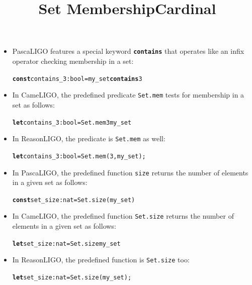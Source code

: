 \documentclass[wide]{slides}
\newcommand{\Kconst}[0]{\textbf{const}\xspace}
\newcommand{\Kcontains}[0]{\textbf{contains}\xspace}
\newcommand{\Klet}[0]{\textbf{let}\xspace}
\begin{document}
\begin{slide}
  \title{Set Membership}

  \begin{itemize}

    \item PascaLIGO features a special keyword
      \textbf{\texttt{contains}} that operates like an infix operator
      checking membership in a set:
      \begin{alltt}
\Kconst contains_3 : bool = my_set \Kcontains 3
      \end{alltt}

    \item In CameLIGO, the predefined predicate \texttt{Set.mem} tests
      for membership in a set as follows:
      \begin{alltt}
\Klet contains_3 : bool = Set.mem 3 my_set
      \end{alltt}

    \item In ReasonLIGO, the predicate is \texttt{Set.mem} as well:
      \begin{alltt}
\Klet contains_3 : bool = Set.mem (3, my_set);
      \end{alltt}

  \end{itemize}

\end{slide}

\begin{slide}
  \title{Cardinal}

  \begin{itemize}

    \item In PascaLIGO, the predefined function \texttt{size} returns
      the number of elements in a given set as follows:
      \begin{alltt}
\Kconst set_size : nat = Set.size (my_set)
      \end{alltt}

    \item In CameLIGO, the predefined function \texttt{Set.size}
      returns the number of elements in a given set as follows:
      \begin{alltt}
\Klet set_size : nat = Set.size my_set
      \end{alltt}

    \item In ReasonLIGO, the predefined function is \texttt{Set.size}
      too:
      \begin{alltt}
\Klet set_size : nat = Set.size (my_set);
      \end{alltt}

  \end{itemize}

\end{slide}
\end{document}
